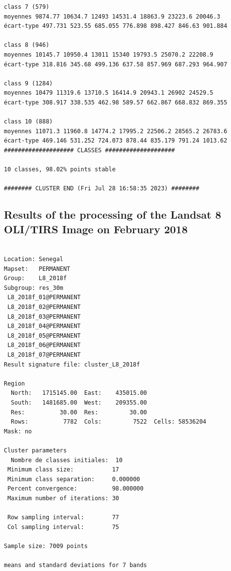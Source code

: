 \documentclass[earth,article,accept,pdftex,moreauthors]{Definitions/mdpi}
\begin{document}
{\begin{scriptsize}
\begin{verbatim}
class 7 (579)
moyennes 9874.77 10634.7 12493 14531.4 18863.9 23223.6 20046.3
écart-type 497.731 523.55 685.055 776.898 898.427 846.63 901.884

class 8 (946)
moyennes 10145.7 10950.4 13011 15340 19793.5 25070.2 22208.9
écart-type 318.816 345.68 499.136 637.58 857.969 687.293 964.907

class 9 (1284)
moyennes 10479 11319.6 13710.5 16414.9 20943.1 26902 24529.5
écart-type 308.917 338.535 462.98 589.57 662.867 668.832 869.355

class 10 (888)
moyennes 11071.3 11960.8 14774.2 17995.2 22506.2 28565.2 26783.6
écart-type 469.146 531.252 724.073 878.44 835.179 791.24 1013.62
#################### CLASSES ####################

10 classes, 98.02% points stable

######## CLUSTER END (Fri Jul 28 16:58:35 2023) ########

\end{verbatim}
\end{scriptsize}

\subsection[\appendixname~\thesubsection]{Results of the processing of the Landsat 8 OLI/TIRS Image on February 2018}
\begin{scriptsize}
\begin{verbatim}

Location: Senegal
Mapset:   PERMANENT
Group:    L8_2018f
Subgroup: res_30m
 L8_2018f_01@PERMANENT
 L8_2018f_02@PERMANENT
 L8_2018f_03@PERMANENT
 L8_2018f_04@PERMANENT
 L8_2018f_05@PERMANENT
 L8_2018f_06@PERMANENT
 L8_2018f_07@PERMANENT
Result signature file: cluster_L8_2018f

Region
  North:   1715145.00  East:    435015.00
  South:   1481685.00  West:    209355.00
  Res:          30.00  Res:         30.00
  Rows:          7782  Cols:         7522  Cells: 58536204
Mask: no

Cluster parameters
  Nombre de classes initiales: 	10
 Minimum class size:           17
 Minimum class separation:     0.000000
 Percent convergence:          98.000000
 Maximum number of iterations: 30

 Row sampling interval:        77
 Col sampling interval:        75

Sample size: 7009 points

means and standard deviations for 7 bands


\end{verbatim}
\end{scriptsize}}
\end{document}
